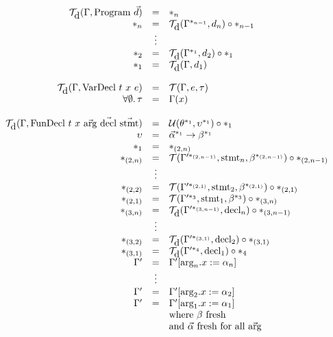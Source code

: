 \documentclass[14pt]{amsart}
\begin{document}
$\begin{array}{rcl}
	\T_{\mbox{d}}(\Gamma, \mbox{Program}~\vec{d}) & = & \s_n \\
	\sn{n} & = & \T_{\mbox{d}}(\Gamma^{\sn{n-1}}, d_n) \circ \sn{n-1} \\
	& \vdots & \\
	\sn{2} & = & \T_{\mbox{d}}(\Gamma^{\sn{1}}, d_2) \circ \sn{1} \\
	\sn{1} & = & \T_{\mbox{d}}(\Gamma, d_1) \\
	
	\\
	
	\T_{\mbox{d}}(\Gamma, \mbox{VarDecl}~t~x~e) & = & \T(\Gamma, e, \tau) \\
	\forall \emptyset . \, \tau	& = & \Gamma(x) \\

	\\

	\T_{\mbox{d}}(\Gamma, \mbox{FunDecl}~t~x~\vec{\mbox{arg}}~\vec{\mbox{decl}}~\vec{\mbox{stmt}}) & = & \U(\theta^{\sn{1}}, \upsilon^{\sn{1}}) \circ \sn{1} \\
	\upsilon	& = & \vec{\alpha}^{\sn{1}} \rightarrow \beta^{\sn{1}} \\
	\sn{1}		& = & \sn{(2,n)} \\
	\sn{(2,n)}	& = & \T(\Gamma'^{\sn{(2,n-1)}}, \mbox{stmt}_n, \beta^{\sn{(2,n-1)}}) \circ \sn{(2,n-1)} \\
	& \vdots & \\
	\sn{(2,2)}	& = & \T(\Gamma'^{\sn{(2,1)}}, \mbox{stmt}_2, \beta^{\sn{(2,1)}}) \circ \sn{(2,1)} \\
	\sn{(2,1)}	& = & \T(\Gamma'^{\sn{3}}, \mbox{stmt}_1, \beta^{\sn{3}}) \circ \sn{(3,n)} \\
	\sn{(3,n)}	& = & \T_{\mbox{d}}(\Gamma'^{\sn{(3,n-1)}}, \mbox{decl}_n) \circ \sn{(3,n-1)} \\
	& \vdots & \\
	\sn{(3,2)}	& = & \T_{\mbox{d}}(\Gamma'^{\sn{(3,1)}}, \mbox{decl}_2) \circ \sn{(3,1)} \\
	\sn{(3,1)}	& = & \T_{\mbox{d}}(\Gamma'^{\sn{4}}, \mbox{decl}_1) \circ \sn{4} \\
	\Gamma'		& = & \Gamma' [\mbox{arg}_n.x := \alpha_n] \\
	& \vdots & \\
	\Gamma'		& = & \Gamma' [\mbox{arg}_2.x := \alpha_2] \\
	\Gamma'		& = & \Gamma' [\mbox{arg}_1.x := \alpha_1] \\
	& & \mbox{where}~\beta~\mbox{fresh} \\
	& & \mbox{and}~\vec{\alpha}~\mbox{fresh for all~} \vec{\mbox{arg}} \\
\end{array}$
\end{document}
